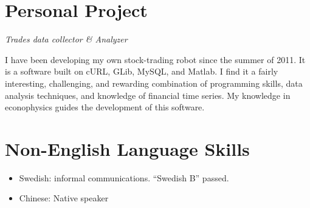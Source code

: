 \documentclass[10pt,letterpaper]{article}
\begin{document}
\section*{Personal Project}
{\it Trades data collector \& Analyzer}

I have been developing my own stock-trading robot since the summer of
2011. It is a software built on cURL, GLib, MySQL, and Matlab. I find
it a fairly interesting, challenging, and rewarding combination of
programming skills, data analysis techniques, and knowledge of
financial time series. My knowledge in econophysics guides the
development of this software.

\section*{Non-English Language Skills}
\begin{itemize}
\item Swedish: informal communications. ``Swedish B'' passed.
\item Chinese: Native speaker
\end{itemize}
\end{document}
